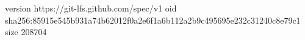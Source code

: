 version https://git-lfs.github.com/spec/v1
oid sha256:85915e545b931a74b62012f0a2e6f1a6b112a2b9c495695e232c31240c8e79c1
size 208704
